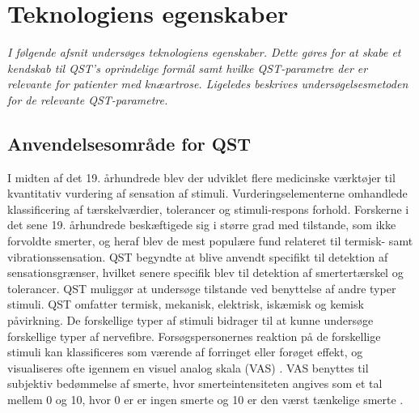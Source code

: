 
\section{Teknologiens egenskaber}
\textit{I følgende afsnit undersøges teknologiens egenskaber. Dette gøres for at skabe et kendskab til QST's oprindelige formål samt hvilke QST-parametre der er relevante for patienter med knæartrose. Ligeledes beskrives undersøgelsesmetoden for de relevante QST-parametre.}

\subsection{Anvendelsesområde for QST}
I midten af det 19. århundrede blev der udviklet flere medicinske værktøjer til kvantitativ vurdering af sensation af stimuli. Vurderingselementerne omhandlede klassificering af tærskelværdier, tolerancer og stimuli-respons forhold. \citep{Yarnitsky1997} Forskerne i det sene 19. århundrede beskæftigede sig i større grad med tilstande, som ikke forvoldte smerter, og heraf blev de mest populære fund relateret til termisk- samt vibrationssensation. \citep{Yarnitsky1997} QST begyndte at blive anvendt specifikt til detektion af sensationsgrænser, hvilket senere specifik blev til detektion af smertertærskel og tolerancer. QST muliggør at undersøge tilstande ved benyttelse af andre typer stimuli. QST omfatter termisk, mekanisk, elektrisk, iskæmisk og kemisk påvirkning. \citep{Yarnitsky2006} De forskellige typer af stimuli bidrager til at kunne undersøge forskellige typer af nervefibre. Forsøgspersonernes reaktion på de forskellige stimuli kan klassificeres som værende af forringet eller forøget effekt, og visualiseres ofte igennem en visuel analog skala (VAS) \citep{Yarnitsky2006}. VAS benyttes til subjektiv bedømmelse af smerte, hvor smerteintensiteten angives som et tal mellem 0 og 10, hvor 0 er er ingen smerte og 10 er den værst tænkelige smerte \citep{smerter}. 

